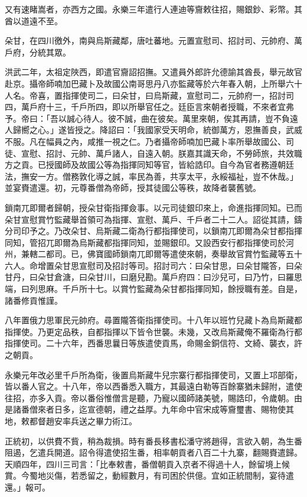 \begin{pinyinscope}
又有速睹嵩者，亦西方之國。永樂三年遣行人連迪等齎敕往招，賜銀鈔、彩幣。其酋以道遠不至。

朵甘，在四川徼外，南與烏斯藏鄰，唐吐蕃地。元置宣慰司、招討司、元帥府、萬戶府，分統其眾。

洪武二年，太祖定陜西，即遣官齎詔招撫。又遣員外郎許允德諭其酋長，舉元故官赴京。攝帝師喃加巴藏卜及故國公南哥思丹八亦監藏等於六年春入朝，上所舉六十人名。帝喜，置指揮使司二，曰朵甘，曰烏斯藏，宣慰司二，元帥府一，招討司四，萬戶府十三，千戶所四，即以所舉官任之。廷臣言來朝者授職，不來者宜弗予。帝曰：「吾以誠心待人。彼不誠，曲在彼矣。萬里來朝，俟其再請，豈不負遠人歸嚮之心。」遂皆授之。降詔曰：「我國家受天明命，統御萬方，恩撫善良，武威不服。凡在幅員之內，咸推一視之仁。乃者攝帝師喃加巴藏卜率所舉故國公、司徒、宣慰、招討、元帥、萬戶諸人，自遠入朝。朕嘉其識天命，不勞師旅，共效職方之貢。已授國師及故國公等為指揮同知等官，皆給誥印。自今為官者務遵朝廷法，撫安一方。僧務敦化導之誠，率民為善，共享太平，永綏福祉，豈不休哉。」並宴賚遣還。初，元尊番僧為帝師，授其徒國公等秩，故降者襲舊號。

鎖南兀即爾者歸朝，授朵甘衛指揮僉事。以元司徒銀印來上，命進指揮同知。已而朵甘宣慰賞竹監藏舉首領可為指揮、宣慰、萬戶、千戶者二十二人。詔從其請，鑄分司印予之。乃改朵甘、烏斯藏二衛為行都指揮使司，以鎖南兀即爾為朵甘都指揮同知，管招兀即爾為烏斯藏都指揮同知，並賜銀印。又設西安行都指揮使司於河州，兼轄二都司。已，佛寶國師鎖南兀即爾等遣使來朝，奏舉故官賞竹監藏等五十六人。命增置朵甘思宣慰司及招討等司。招討司六：曰朵甘思，曰朵甘隴答，曰朵甘丹，曰朵甘倉溏，曰朵甘川，曰磨兒勘。萬戶府四：曰沙兒可，曰乃竹，曰羅思端，曰列思麻。千戶所十七。以賞竹監藏為朵甘都指揮同知，餘授職有差。自是，諸番修貢惟謹。

八年置俄力思軍民元帥府。尋置隴答衛指揮使司。十八年以班竹兒藏卜為烏斯藏都指揮使。乃更定品秩，自都指揮以下皆令世襲。未幾，又改烏斯藏俺不羅衛為行都指揮使司。二十六年，西番思曩日等族遣使貢馬，命賜金銅信符、文綺、襲衣，許之朝貢。

永樂元年改必里千戶所為衛，後置烏斯藏牛兒宗寨行都指揮使司，又置上邛部衛，皆以番人官之。十八年，帝以西番悉入職方，其最遠白勒等百餘寨猶未歸附，遣使往招，亦多入貢。帝以番俗惟僧言是聽，乃寵以國師諸美號，賜誥印，令歲朝。由是諸番僧來者日多，迄宣德朝，禮之益厚。九年命中官宋成等齎璽書、賜物使其地，敕都督趙安率兵送之畢力術江。

正統初，以供費不貲，稍為裁損。時有番長移書松潘守將趙得，言欲入朝，為生番阻遏，乞遣兵開道。詔令得遣使招生番，相率朝貢者八百二十九寨，翻賜賚遣歸。天順四年，四川三司言：「比奉敕書，番僧朝貢入京者不得過十人，餘留境上候賞。今蜀地災傷，若悉留之，動經數月，有司困於供億。宜如正統間制，宴待遣還。」報可。


\end{pinyinscope}
